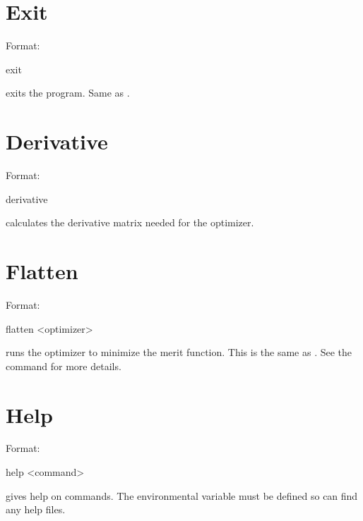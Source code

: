 \section{Exit}
\label{s:exit}

Format:
\begin{example}
  exit
\end{example}

\vskip 0.2in
 exits the program. Same as .

\section{Derivative}
\label{s:deriv}

Format:
\begin{example}
  derivative
\end{example}

\vskip 0.2in  calculates the  derivative
matrix needed for the  optimizer.

\section{Flatten}
\label{s:flatten}

Format:
\begin{example}
  flatten <optimizer>
\end{example}

\vskip 0.2in
 runs the optimizer to minimize the merit function. This is the 
same as . See the  command for more details.

\section{Help}
\label{s:help}

Format:
\begin{example}
  help <command>
\end{example}

\vskip 0.2in 
 gives help on \tao commands. The environmental
variable  must be defined so \tao can find any help files.

